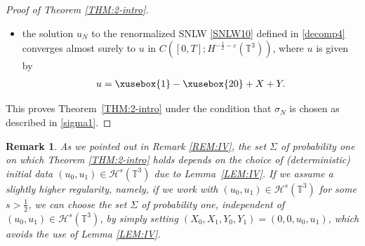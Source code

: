 \documentclass[%
11pt,  reqno]{amsart}
\def\<#1>{\xusebox{#1}}
\newtheorem{remark}[theorem]{Remark}
\newcommand{\1}{\hspace{0.2mm}\text{I}\hspace{0.2mm}}
\newcommand{\noi}{\noindent}
\newcommand{\T}{\mathbb{T}}
\newcommand{\eps}{\varepsilon}
\newcommand{\s}{\sigma}
\newcommand{\Si}{\Sigma}
\renewcommand{\H}{\mathcal{H}}
\numberwithin{equation}{section}
\numberwithin{theorem}{section}
\begin{document}
\begin{proof}[Proof of Theorem \ref{THM:2-intro}]
\begin{itemize}
\smallskip

\item 
the solution $u_N$ to the renormalized SNLW \eqref{SNLW10}
defined  in \eqref{decomp4}
converges almost surely to  $u$ 
in $C([0, T]; H^{-\frac 12 -\eps} (\T^3))$, 
where $u$ is 
 given by 
\begin{align}
u = \<1> - \<20> + X + Y.
\label{so8}
\end{align}


\end{itemize}

\noi 
This proves Theorem~\ref{THM:2-intro} under the condition that $\s_N$ is chosen as described in  
\eqref{sigma1}.
\end{proof}


\begin{remark}\rm
As we pointed out in Remark \ref{REM:IV}, 
the set $\Si$ of probability one
on which Theorem \ref{THM:2-intro} holds
depends
on the choice of (deterministic) initial data $(u_0, u_1) \in \H^s(\T^3)$
due to Lemma~\ref{LEM:IV}.
If  we assume a slightly higher regularity, 
namely, if we work with $(u_0, u_1) \in \H^{s}(\T^3)$ for some $s > \frac 12$, 
we can choose the set $\Si$ of probability one, independent of $(u_0, u_1) \in \H^s(\T^3)$, 
by simply setting
$(X_0, X_1, Y_0, Y_1) = (0, 0, u_0, u_1)$,
which avoids the use of Lemma \ref{LEM:IV}.
\end{remark}
\end{document}
